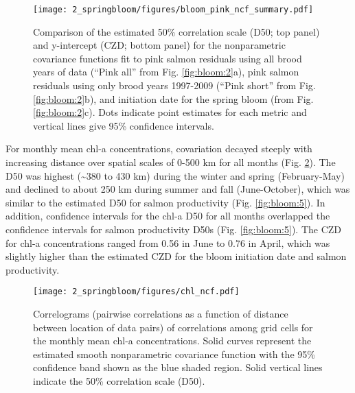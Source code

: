 \begin{figure}[htbp]
  \centering \texttt{[image: 2\_springbloom/figures/bloom\_pink\_ncf\_summary.pdf]}
  \caption[Comparison of the estimated 50\% correlation scale
           and y-intercept from the nonparametric covariance
           functions.]{Comparison of the estimated 50\% correlation scale (D50;
           top panel) and y-intercept (CZD; bottom panel) for the nonparametric
           covariance functions fit to pink salmon residuals using all brood
           years of data (``Pink all'' from Fig. \ref{fig:bloom:2}a), pink
           salmon residuals using only brood years 1997-2009 (``Pink short''
           from Fig. \ref{fig:bloom:2}b), and initiation date for the spring
           bloom (from Fig. \ref{fig:bloom:2}c). Dots indicate point estimates
           for each metric and vertical lines give 95\% confidence intervals.}
  \label{fig:bloom:3}
\end{figure}

For monthly mean chl-a concentrations, covariation decayed steeply with
increasing distance over spatial scales of 0-500 km for all months (Fig.
\ref{fig:bloom:4}).  The D50 was highest (\textasciitilde{}380 to 430 km) during
the winter and spring (February-May) and declined to about 250 km during summer
and fall (June-October), which was similar to the estimated D50 for salmon
productivity (Fig. \ref{fig:bloom:5}). In addition, confidence intervals for the
chl-a D50 for all months overlapped the confidence intervals for salmon
productivity D50s (Fig.  \ref{fig:bloom:5}). The CZD for chl-a concentrations
ranged from 0.56 in June to 0.76 in April, which was slightly higher than the
estimated CZD for the bloom initiation date and salmon productivity.

\begin{figure}[htbp]
  \centering \texttt{[image: 2\_springbloom/figures/chl\_ncf.pdf]}
  \caption[Correlograms of correlations among grid cells for the monthly
           mean chl-a concentrations.]{Correlograms (pairwise correlations as a
           function of distance between location of data pairs) of correlations
           among grid cells for the monthly mean chl-a concentrations. Solid
           curves represent the estimated smooth nonparametric covariance
           function with the 95\% confidence band shown as the blue shaded
           region. Solid vertical lines indicate the 50\% correlation scale
           (D50).}
  \label{fig:bloom:4}
\end{figure}

